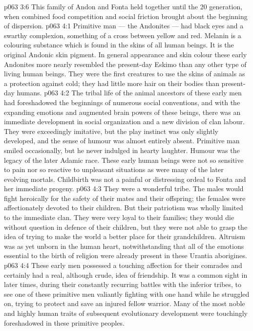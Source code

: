 \vs p063 3:6 \pc This family of Andon and Fonta held together until the 20 generation, when combined food competition and social friction brought about the beginning of dispersion.
\vs p063 4:1 Primitive man --- the Andonites --- had black eyes and a swarthy complexion, something of a cross between yellow and red. Melanin is a colouring substance which is found in the skins of all human beings. It is the original Andonic skin pigment. In general appearance and skin colour these early Andonites more nearly resembled the present\hyp{}day Eskimo than any other type of living human beings. They were the first creatures to use the skins of animals as a protection against cold; they had little more hair on their bodies than present\hyp{}day humans.
\vs p063 4:2 The tribal life of the animal ancestors of these early men had foreshadowed the beginnings of numerous social conventions, and with the expanding emotions and augmented brain powers of these beings, there was an immediate development in social organization and a new division of clan labour. They were exceedingly imitative, but the play instinct was only slightly developed, and the sense of humour was almost entirely absent. Primitive man smiled occasionally, but he never indulged in hearty laughter. Humour was the legacy of the later Adamic race. These early human beings were not so sensitive to pain nor so reactive to unpleasant situations as were many of the later evolving mortals. Childbirth was not a painful or distressing ordeal to Fonta and her immediate progeny.
\vs p063 4:3 \pc They were a wonderful tribe. The males would fight heroically for the safety of their mates and their offspring; the females were affectionately devoted to their children. But their patriotism was wholly limited to the immediate clan. They were very loyal to their families; they would die without question in defence of their children, but they were not able to grasp the idea of trying to make the world a better place for their grandchildren. Altruism was as yet unborn in the human heart, notwithstanding that all of the emotions essential to the birth of religion were already present in these Urantia aborigines.
\vs p063 4:4 These early men possessed a touching affection for their comrades and certainly had a real, although crude, idea of friendship. It was a common sight in later times, during their constantly recurring battles with the inferior tribes, to see one of these primitive men valiantly fighting with one hand while he struggled on, trying to protect and save an injured fellow warrior. Many of the most noble and highly human traits of subsequent evolutionary development were touchingly foreshadowed in these primitive peoples.
